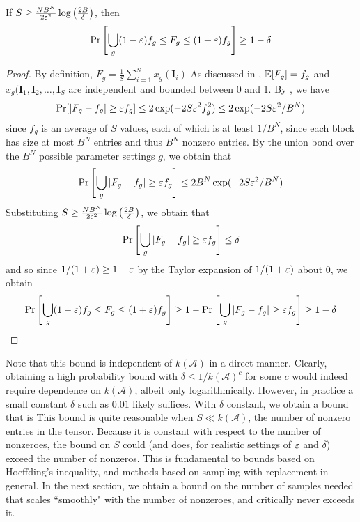 \begin{thm} \label{thm:with-replacement}
If $S \geq \frac{N B^N}{2 \varepsilon^2} \log \left( \frac{2B}{\delta} \right)$, then
\[
\Pr\left[\bigcup_g (1 - \varepsilon) f_g \leq F_g \leq (1 + \varepsilon) f_g\right] \geq 1 - \delta
\]
\end{thm}

\begin{proof}
By definition, $F_g = \frac{1}{S} \sum_{i = 1}^S x_g(\mathbf{I}_i)$
As discussed in , $\mathbb{E}[F_g] = f_g$ and $x_g(\mathbf{I}_1, \mathbf{I}_2, \dots, \mathbf{I}_S$ are independent and bounded between 0 and 1.
By , we have
\[
\Pr[|F_g - f_g| \geq \varepsilon f_g]
\leq 2\exp(-2 S \varepsilon^2 f_g^2)
\leq 2\exp(-2 S \varepsilon^2 / B^N)
\]
since $f_g$ is an average of $S$ values, each of which is at least $1/B^N$, since each block has size at most $B^N$ entries and thus $B^N$ nonzero entries.
By the union bond over the $B^N$ possible parameter settings $g$, we obtain that
\[
\Pr\left[ \bigcup_g |F_g - f_g| \geq \varepsilon f_g \right]
\leq 2 B^N \exp(-2 S \varepsilon^2 / B^N)
\]
Substituting $S \geq \frac{N B^N}{2 \varepsilon^2} \log \left( \frac{2B}{\delta} \right)$, we obtain that
\[
\Pr\left[ \bigcup_g |F_g - f_g| \geq \varepsilon f_g \right] \leq \delta
\]
and so since $1/(1 + \varepsilon) \geq 1 - \varepsilon$ by the Taylor expansion of $1/(1 + \varepsilon)$ about 0, we obtain
\[
\Pr\left[ \bigcup_g (1 - \varepsilon) f_g \leq F_g \leq (1 + \varepsilon) f_g\right] \geq 1 - \Pr\left[\bigcup_g |F_g - f_g| \geq \varepsilon f_g \right] \geq 1 - \delta \qedhere
\]
\end{proof}

Note that this bound is independent of $k(\mathcal{A})$ in a direct manner.
Clearly, obtaining a high probability bound with $\delta \leq 1/k(\mathcal{A})^c$ for some $c$ would indeed require dependence on $k(\mathcal{A})$, albeit only logarithmically.
However, in practice a small constant $\delta$ such as $0.01$ likely suffices.
With $\delta$ constant, we obtain a bound that is 
This bound is quite reasonable when $S \ll k(\mathcal{A})$, the number of nonzero entries in the tensor.
Because it is constant with respect to the number of nonzeroes, the bound on $S$ could (and does, for realistic settings of $\varepsilon$ and $\delta$) exceed the number of nonzeros.
This is fundamental to bounds based on Hoeffding's inequality, and methods based on sampling-with-replacement in general.
In the next section, we obtain a bound on the number of samples needed that scales ``smoothly" with the number of nonzeroes, and critically never exceeds it.

